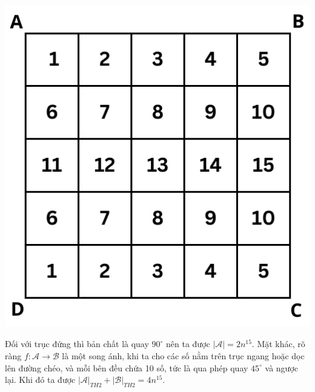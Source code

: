 \documentclass[11pt]{scrartcl}
\begin{document}
\begin{itemize}[label=, leftmargin=0em, itemsep=-0em]
\begin{sol}
\begin{center}
                \includegraphics[scale=0.57]{trucngang.pdf}
            \end{center}
            Đối với trục đứng thì bản chất là quay $90^{\circ}$ nên ta được $|\mathcal{A}| = 2n^{15}$. Mặt khác, rõ ràng $f: \mathcal{A} \to \mathcal{B}$ là một song ánh, khi ta cho các số nằm trên trục ngang hoặc dọc lên đường chéo, và mỗi bên đều chứa 10 số, tức là qua phép quay $45^{\circ}$ và ngược lại. Khi đó ta được $|\mathcal{A}|_{TH2} + |\mathcal{B}|_{TH2} = 4n^{15}$.


\end{sol}
\end{itemize}
\end{document}
